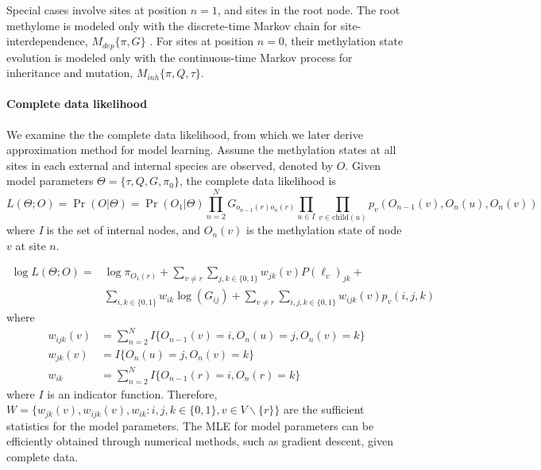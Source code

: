 \documentclass[11pt]{article}
\theoremstyle{theorem}
\theoremstyle{proposition}
\newcommand{\child}[1]{\ensuremath{\mathrm{child}(#1)}}
\begin{document}
Special cases involve sites at position $n=1$, and sites in the root
node.  The root methylome is modeled only with the discrete-time
Markov chain for site-interdependence, $M_{dep}\{\pi, G\}$ .  For
sites at position $n=0$, their methylation state evolution is modeled
only with the continuous-time Markov process for inheritance and
mutation, $M_{inh}\{\pi, Q, \tau\}$.

\paragraph{Complete data likelihood}
We examine the the complete data likelihood, from which
we later derive approximation method for model learning. Assume the
methylation states at all sites in each external and internal species
are observed, denoted by $O$. Given model parameters
$\Theta=\{\tau, Q, G, \pi_0\}$, the complete data likelihood
is
\[
L(\Theta; O) =
\Pr(O|\Theta) = \Pr(O_1|\Theta) \prod_{n=2}^{N}G_{o_{n-1}(r)o_{n}(r)}\prod_{u\in \textit{I}} \prod_{v\in \child{u}} p_v(O_{n-1}(v), O_{n}(u), O_{n}(v))
\]
where \textit{I} is the set of internal nodes, and $O_{n}(v)$ is the methylation state of node $v$ at site $n$.

\begin{equation}\label{eq:complik}
\begin{aligned}
 \log L(\Theta; O) =
 & \log\pi_{O_1(r)} + \sum_{v\neq r}\sum_{j,k\in\{0,1\}}w_{jk}(v)P(\ell_v)_{jk} + \\
 & \sum_{i,k\in\{0,1\}}w_{ik}\log(G_{ij}) + \sum_{v\neq r}\sum_{i,j,k\in\{0,1\}}w_{ijk}(v) p_v(i,j,k)
\end{aligned}
\end{equation}
where
\begin{equation}\label{eq:sufstat}
\begin{aligned}
w_{ijk}(v) &= \sum_{n=2}^N I\{O_{n-1}(v)= i, O_{n}(u)=j, O_{n}(v)=k\}\\
w_{jk}(v) &= I\{O_{n}(u)=j, O_{n}(v)=k\} \\
w_{ik} &= \sum_{n=2}^N I\{O_{n-1}(r)= i, O_{n}(r)=k\}
\end{aligned}
\end{equation}
where $I$ is an indicator function. Therefore, $W=\{ w_{jk}(v),
w_{ijk}(v), w_{ik} : i, j, k\in\{0,1\}, v\in
\textit{V}\backslash\{r\}\}$ are the sufficient statistics for the
model parameters. The MLE for model parameters can be efficiently
obtained through numerical methods, such as gradient descent, given
complete data.
\end{document}
